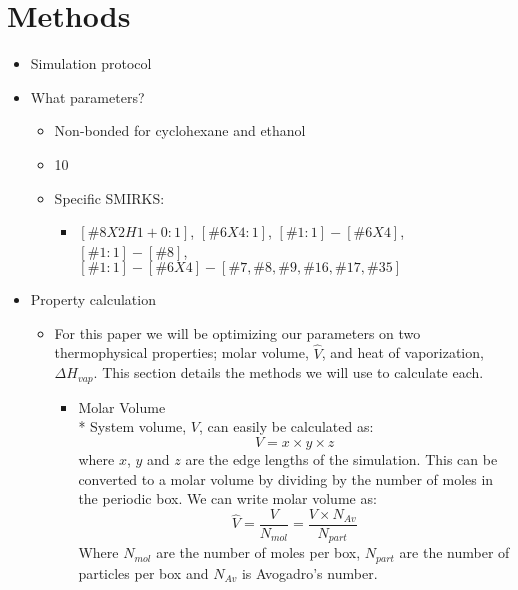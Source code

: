 \documentclass[aps,pre,nofootinbib,superscriptaddress,linenumbers,10pt, draft,tightenlines]{revtex4-1}
\begin{document}
\section{Methods}
\begin{itemize}
	\item Simulation protocol
	\item What parameters?
	\begin{itemize}
		\item Non-bonded for cyclohexane and ethanol %
		\item 10
		\item Specific SMIRKS:
		\begin{itemize}
			\item $[\#8X2H1+0:1]$, $[\#6X4:1]$, $[\#1:1]-[\#6X4]$, $[\#1:1]-[\#8]$, 
			      $[\#1:1]-[\#6X4]-[\#7,\#8,\#9,\#16,\#17,\#35]$
		\end{itemize}
	\end{itemize}
    \item Property calculation
    \begin{itemize}
        \item For this paper we will be optimizing our parameters on two thermophysical
              properties; molar volume, $\hat{V}$, and heat of 
              vaporization, $\Delta H_{vap}$. This section details the methods we will use to
              calculate each.
        \begin{itemize}
    	    \item Molar Volume \\*
    	    System volume, $V$, can easily be calculated as:
    	    \begin{equation} V = x \times y \times z \end{equation}
    	    where $x$, $y$ and $z$ are the edge lengths of the simulation.
    	    This can be converted to a molar volume by dividing by the number of moles in the     
            periodic box. We can write molar volume as:
    	    \begin{equation} \hat{V} = \frac{V}{N_{mol}} = \frac{V \times N_{Av}}{N_{part}}                   \end{equation}
    	    Where $N_{mol}$ are the number of moles per box, $N_{part}$ are the number of        
            particles per box and $N_{Av}$ 
    	    is Avogadro's number.
    	

\end{itemize}
\end{itemize}
\end{itemize}
\end{document}

